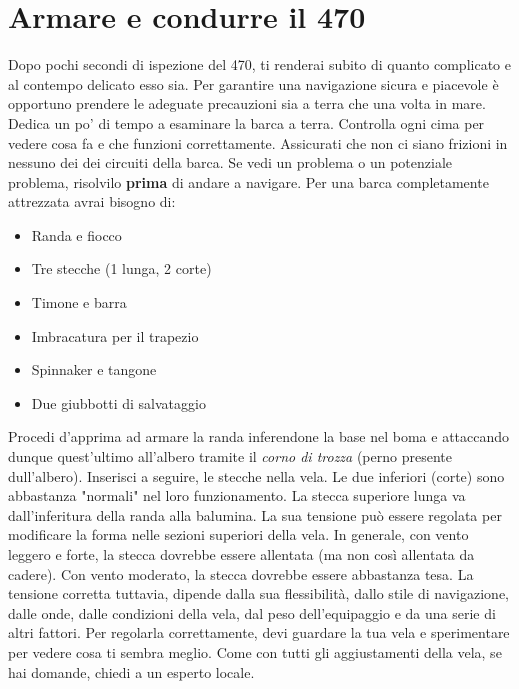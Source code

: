 
\section{Armare e condurre il 470}
\label{sec:RegolazioneDellaBarca}
Dopo pochi secondi di ispezione del 470, ti renderai subito di quanto complicato
e al contempo delicato esso sia. Per garantire una navigazione sicura e
piacevole è opportuno prendere le adeguate precauzioni sia a terra che una volta
in mare. Dedica un po' di tempo a esaminare la barca a terra. Controlla ogni cima per vedere cosa fa e che funzioni correttamente.
Assicurati che non ci siano frizioni in nessuno dei dei circuiti della
barca. Se vedi un problema o un potenziale problema, risolvilo \textbf{prima} di andare a
navigare. Per una barca completamente attrezzata avrai bisogno di:
\begin{itemize}
    \item Randa e fiocco
    \item Tre stecche (1 lunga, 2 corte)
    \item Timone e barra
    \item Imbracatura per il trapezio
    \item Spinnaker e tangone
    \item Due giubbotti di salvataggio
\end{itemize}
Procedi d'apprima ad armare la randa inferendone la base nel boma e attaccando
dunque quest'ultimo all'albero tramite il \emph{corno di trozza} (perno presente
dull'albero). Inserisci a seguire, le stecche nella vela. Le due inferiori (corte)
sono abbastanza "normali" nel loro funzionamento. La stecca superiore lunga va
dall'inferitura della randa alla balumina. La sua tensione può essere regolata
per modificare la forma nelle sezioni superiori
della vela. In generale, con vento leggero e forte, la stecca dovrebbe essere
allentata (ma non così allentata da cadere). Con vento moderato, la stecca
dovrebbe essere abbastanza tesa. La tensione corretta tuttavia, dipende
dalla sua flessibilità, dallo stile di navigazione, dalle onde, dalle
condizioni della vela, dal peso dell'equipaggio e da una serie di altri fattori.
Per regolarla correttamente, devi guardare la tua vela e sperimentare per vedere
cosa ti sembra meglio. Come con tutti gli aggiustamenti della vela, se
hai domande, chiedi a un esperto locale.

